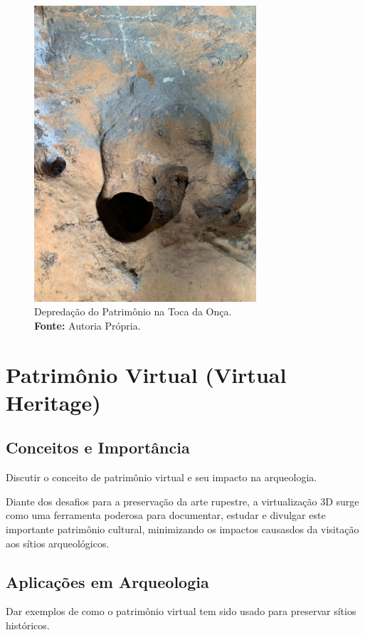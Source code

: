 \begin{figure}[H]
    \centering
    \includegraphics[height=11cm, keepaspectratio]{img/jogo da velha.jpeg}
    \caption{Depredação do Patrimônio na Toca da Onça. \\
        \textbf{Fonte:} Autoria Própria.}
    \label{fig:degradacao_toca_onca}
\end{figure}


\section{Patrimônio Virtual (Virtual Heritage)}
\subsection{Conceitos e Importância}
Discutir o conceito de patrimônio virtual e seu impacto na arqueologia.

Diante dos desafios para a preservação da arte rupestre, a virtualização 3D surge como uma ferramenta poderosa para documentar, estudar e divulgar este importante patrimônio cultural, minimizando os impactos causasdos da visitação aos sítios arqueológicos.

\subsection{Aplicações em Arqueologia}
Dar exemplos de como o patrimônio virtual tem sido usado para preservar sítios históricos.




